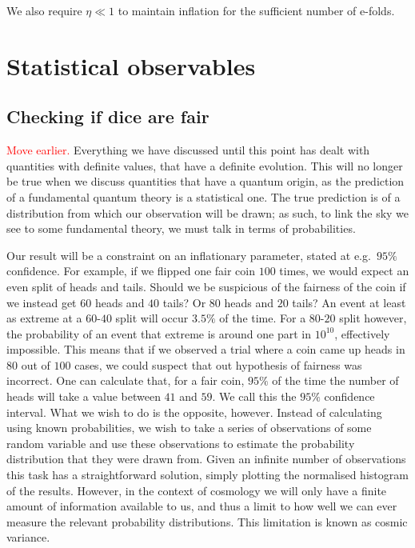We also require $\eta\ll1$ to maintain inflation for the sufficient number
of e-folds.


\newpage
\section{Statistical observables}
    \subsection{Checking if dice are fair}
\textcolor{red}{Move earlier.}
    Everything we have discussed until this point has dealt with quantities
    with definite values, that have a definite evolution. This will no longer
    be true when we discuss quantities that have a quantum origin, as
    the prediction of a fundamental quantum theory is a statistical one.
    The true prediction is of a distribution from which our observation will be drawn;
    as such, to link the sky we see to some fundamental theory,
    we must talk in terms of probabilities.


    Our result will be a constraint on an inflationary parameter, stated at e.g.\ $95\%$ confidence.
    For example, if we flipped one fair coin $100$ times, we would expect an even split of heads
    and tails. Should we be suspicious of the fairness of the coin if we instead get $60$ heads
    and $40$ tails? Or $80$ heads and $20$ tails? An event at least as extreme at a $60$-$40$ split
    will occur $3.5\%$ of the time. For a $80$-$20$ split however, the probability of an event that
    extreme is around one part in $10^{10}$, effectively impossible. This means that if we observed
    a trial where a coin came up heads in $80$ out of $100$ cases, we could suspect that out hypothesis
    of fairness was incorrect.
    One can calculate that, for a fair coin, $95\%$ of the time the number of heads will take a value
    between $41$ and $59$. We call this the $95\%$ confidence interval.
    What we wish to do is the opposite, however. Instead of calculating using known probabilities,
    we wish to take a series of observations of some random variable and use these observations
    to estimate the probability distribution that they were drawn from. Given an infinite number
    of observations this task has a straightforward solution, simply plotting the normalised
    histogram of the results. However, in the context of cosmology we will only have a finite amount
    of information available to us, and thus a limit to how well we can ever measure the relevant
    probability distributions. This limitation is known as cosmic variance.



